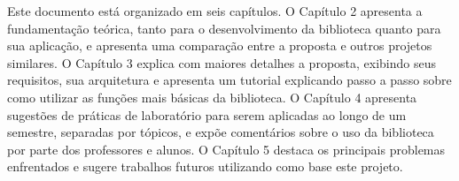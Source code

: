 Este documento está organizado em seis capítulos. O Capítulo 2 apresenta a fundamentação teórica, tanto para o desenvolvimento da biblioteca quanto para sua aplicação, e apresenta uma comparação entre a proposta e outros projetos similares. O Capítulo 3 explica com maiores detalhes a proposta, exibindo seus requisitos, sua arquitetura e apresenta um tutorial explicando passo a passo sobre como utilizar as funções mais básicas da biblioteca. O Capítulo 4 apresenta sugestões de práticas de laboratório para serem aplicadas ao longo de um semestre, separadas por tópicos, e expõe comentários sobre o uso da biblioteca por parte dos professores e alunos. O Capítulo 5 destaca os principais problemas enfrentados e sugere trabalhos futuros utilizando como base este projeto.



